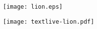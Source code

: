 \documentclass[nofonts]{ctexart}
\begin{document}
\begin{figure}
	\centering
	\begin{varwidth}[t]{\textwidth}
		\vspace{0pt}
		\texttt{[image: lion.eps]}
	\end{varwidth}
	\qquad
	\begin{varwidth}[t]{\textwidth}
		\vspace{0pt}
		\texttt{[image: textlive-lion.pdf]}
	\end{varwidth}
\end{figure}
\end{document}
